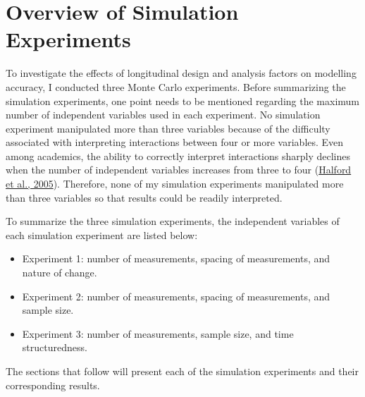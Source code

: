 \documentclass[
12pt, %
twoside,
english]{guelphthesis}
\begin{document}
\hypertarget{overview-of-simulation-experiments}{%
\section{Overview of Simulation Experiments}\label{overview-of-simulation-experiments}}

To investigate the effects of longitudinal design and analysis factors on modelling accuracy, I conducted three Monte Carlo experiments. Before summarizing the simulation experiments, one point needs to be mentioned regarding the maximum number of independent variables used in each experiment. No simulation experiment manipulated more than three variables because of the difficulty associated with interpreting interactions between four or more variables. Even among academics, the ability to correctly interpret interactions sharply declines when the number of independent variables increases from three to four (\protect\hyperlink{ref-halford2005}{Halford et al., 2005}). Therefore, none of my simulation experiments manipulated more than three variables so that results could be readily interpreted.

To summarize the three simulation experiments, the independent variables of each simulation experiment are listed below:
\begin{itemize}
\tightlist
\item
  Experiment 1: number of measurements, spacing of measurements, and nature of change.
\item
  Experiment 2: number of measurements, spacing of measurements, and sample size.
\item
  Experiment 3: number of measurements, sample size, and time structuredness.
\end{itemize}
\noindent The sections that follow will present each of the simulation experiments and their corresponding results.
\end{document}
